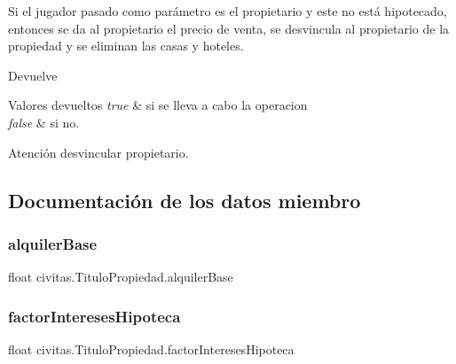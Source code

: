 Si el jugador pasado como parámetro es el propietario y este no está hipotecado, entonces se da al propietario el precio de venta, se desvincula al propietario de la propiedad y se eliminan las casas y hoteles. \begin{DoxyReturn}{Devuelve}

\end{DoxyReturn}

\begin{DoxyRetVals}{Valores devueltos}
{\em true} & si se lleva a cabo la operacion \\
\hline
{\em false} & si no. \\
\hline
\end{DoxyRetVals}
\begin{DoxyWarning}{Atención}
desvincular propietario. 
\end{DoxyWarning}


\subsection{Documentación de los datos miembro}
\mbox{\label{classcivitas_1_1TituloPropiedad_ad372303cdfec1ef367ce5173b4cf190f}} 
\subsubsection{\texorpdfstring{alquiler\+Base}{alquilerBase}}
{\footnotesize\ttfamily float civitas.\+Titulo\+Propiedad.\+alquiler\+Base\hspace{0.3cm}{\ttfamily [private]}}

\mbox{\label{classcivitas_1_1TituloPropiedad_abd6ce22a95527549a5d16c8d7b9fe7c4}} 
\subsubsection{\texorpdfstring{factor\+Intereses\+Hipoteca}{factorInteresesHipoteca}}
{\footnotesize\ttfamily float civitas.\+Titulo\+Propiedad.\+factor\+Intereses\+Hipoteca\hspace{0.3cm}{\ttfamily [private]}}

